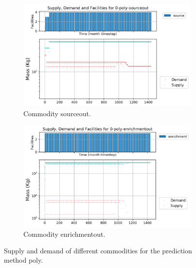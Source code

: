 \documentclass[11pt]{article}
\begin{document}
\begin{figure}[!h]
	\centering
	\begin{subfigure}[]{0.45\textwidth}
		\centering
		\includegraphics[width=\linewidth]{23-figures/0-poly-sourceout.png} 
		\caption{Commodity sourceout.}
		\label{fig:23-sourceout}
	\end{subfigure}
	\vspace{1cm}
	\begin{subfigure}[]{0.45\textwidth}
		\centering
		\includegraphics[width=\linewidth]{23-figures/0-poly-enrichmentout.png} 
		\caption{Commodity enrichmentout.}
		\label{fig:23-enrichmentout}
	\end{subfigure}
	\hfill
	\caption{Supply and demand of different commodities for the prediction method poly.}
	\label{fig:23-front}
\end{figure}
\end{document}
